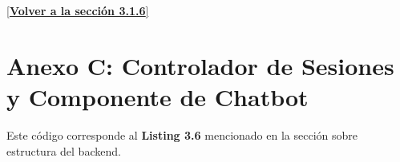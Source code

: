 \documentclass[12pt,a4paper]{report}
\numberwithin{figure}{section}
\begin{document}
\vspace{1em}
\begin{center}
\hyperref[lst:chat-routes-ref]{[\textbf{Volver a la sección 3.1.6}]}
\end{center}

\newpage

\section*{Anexo C: Controlador de Sesiones y Componente de Chatbot}
\label{lst:backend-controller-code}

\noindent Este código corresponde al \textbf{Listing 3.6} mencionado en la sección sobre estructura del backend.
\end{document}
